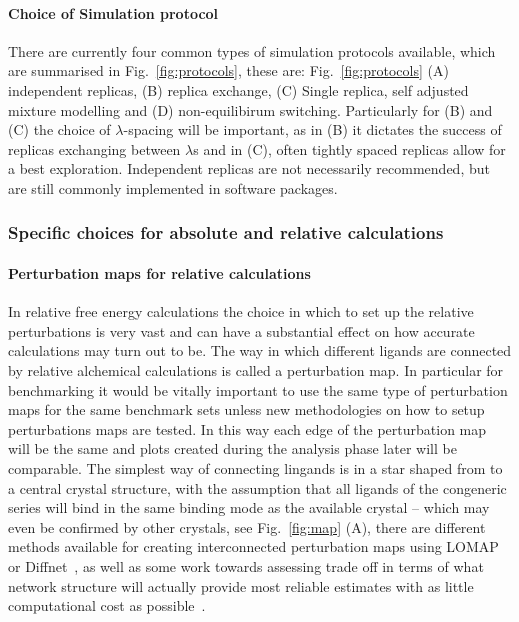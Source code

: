 \documentclass[9pt,bestpractices]{livecoms}
\begin{document}
\paragraph{Choice of Simulation protocol}
There are currently four common types of simulation protocols available, which are summarised in Fig.~\ref{fig:protocols}, these are: Fig.~\ref{fig:protocols} (A) independent replicas, (B) replica exchange, (C) Single replica, self adjusted mixture modelling and (D) non-equilibirum switching. Particularly for (B) and (C) the choice of $\lambda$-spacing will be important, as in (B) it dictates the success of replicas exchanging between $\lambda$s and in (C), often tightly spaced replicas allow for a best exploration. Independent replicas are not necessarily recommended, but are still commonly implemented in software packages. 

\subsubsection{Specific choices for absolute and relative calculations}
\paragraph{Perturbation maps for relative calculations}
In relative free energy calculations the choice in which to set up the relative perturbations is very vast and can have a substantial effect on how accurate calculations may turn out to be. The way in which different ligands are connected by relative alchemical calculations is called a perturbation map. In particular for benchmarking it would be vitally important to use the same type of perturbation maps for the same benchmark sets unless new methodologies on how to setup perturbations maps are tested. In this way each edge of the perturbation map will be the same and plots created during the analysis phase later will be comparable. The simplest way of connecting lingands is in a star shaped from to a central crystal structure, with the assumption that all ligands of the congeneric series will bind in the same binding mode as the available crystal -- which may even be confirmed by other crystals, see Fig.~\ref{fig:map} (A), there are different methods available for creating interconnected perturbation maps using LOMAP~\cite{} or Diffnet~\cite{}, as well as some work towards assessing trade off in terms of what network structure will actually provide most reliable estimates with as little computational cost as possible~\cite{}.
\end{document}

